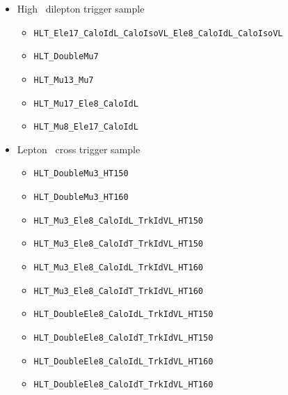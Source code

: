    \begin{itemize}
      \item High \pt\ dilepton trigger sample
      \begin{itemize}
         \item \verb=HLT_Ele17_CaloIdL_CaloIsoVL_Ele8_CaloIdL_CaloIsoVL=
         \item \verb=HLT_DoubleMu7=
         \item \verb=HLT_Mu13_Mu7=
         \item \verb=HLT_Mu17_Ele8_CaloIdL=
         \item \verb=HLT_Mu8_Ele17_CaloIdL=
      \end{itemize}
      \item Lepton \Ht\ cross trigger sample
      \begin{itemize}
        \item \verb=HLT_DoubleMu3_HT150=
        \item \verb=HLT_DoubleMu3_HT160=
        \item \verb=HLT_Mu3_Ele8_CaloIdL_TrkIdVL_HT150=
        \item \verb=HLT_Mu3_Ele8_CaloIdT_TrkIdVL_HT150=
        \item \verb=HLT_Mu3_Ele8_CaloIdL_TrkIdVL_HT160=
        \item \verb=HLT_Mu3_Ele8_CaloIdT_TrkIdVL_HT160=
        \item \verb=HLT_DoubleEle8_CaloIdL_TrkIdVL_HT150=
        \item \verb=HLT_DoubleEle8_CaloIdT_TrkIdVL_HT150=
        \item \verb=HLT_DoubleEle8_CaloIdL_TrkIdVL_HT160=
        \item \verb=HLT_DoubleEle8_CaloIdT_TrkIdVL_HT160=
      \end{itemize}
   \end{itemize}








